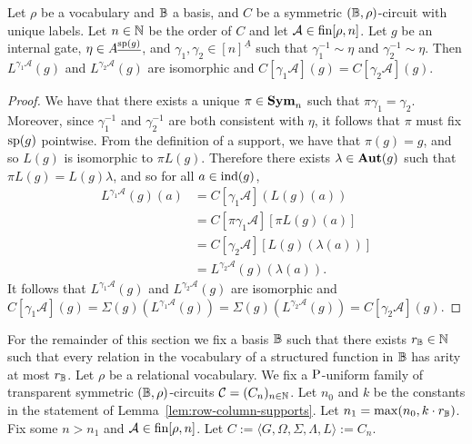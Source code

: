 \documentclass[../main/thesis.tex]{subfiles}
\begin{document}
\begin{lem}
  Let $\rho$ be a vocabulary and $\mathbb{B}$ a basis, and $C$ be a symmetric $(\mathbb{B},
  \rho)$-circuit with unique labels. Let $n \in \mathbb{N}$ be the order of $C$ and
  let $\mathcal{A} \in \text{\upshape fin}{[\rho, n]}$. Let $g$ be an internal gate, $\eta \in
  A^{\underline{\text{sp}(g)}}$, and $\gamma_1, \gamma_2 \in [n]^{\underline{A}}$
  such that $\gamma^{-1}_1 \sim \eta$ and $\gamma^{-1}_2 \sim \eta$. Then
  $L^{\gamma_1 \mathcal{A}}(g)$ and $L^{\gamma_2 \mathcal{A}}(g)$ are isomorphic
  and $C[\gamma_1 \mathcal{A}](g) = C[\gamma_2 \mathcal{A}](g)$.
	\label{lem:support-determines-evaluation}
\end{lem}
\begin{proof}
	We have that there exists a unique $\pi \in \text{\textbf{Sym}}_n$ such that $\pi \gamma_1 =
  \gamma_2$. Moreover, since $\gamma^{-1}_1$ and $\gamma^{-1}_2$ are both
  consistent with $\eta$, it follows that $\pi$ must fix $\text{sp}(g)$ pointwise.
  From the definition of a support, we have that $\pi (g) = g$, and so $L(g)$ is
  isomorphic to $\pi L(g)$. Therefore there exists $\lambda \in \text{\textbf{Aut}}(g)$ such
  that $\pi L(g) = L(g) \lambda$, and so for all $a \in \text{\upshape ind}(g)$,
	\begin{align*}
		L^{\gamma_1 \mathcal{A}}(g) (a) & = C [\gamma_1 \mathcal{A}](L(g)(a))                    \\
                                    & = C[\pi \gamma_1 \mathcal{A}][\pi L(g)(a)]            \\
                                    & = C[\gamma_2 \mathcal{A}][L(g)(\lambda(a))] \\
                                    & = L^{\gamma_2 \mathcal{A}}(g) (\lambda (a)).                 
	\end{align*}
	It follows that $L^{\gamma_1 \mathcal{A}}(g)$ and $L^{\gamma_2
    \mathcal{A}}(g)$ are isomorphic and $C[\gamma_1 \mathcal{A}](g) = \Sigma(g)
  (L^{\gamma_1 \mathcal{A}}(g)) = \Sigma(g) (L^{\gamma_2 \mathcal{A}}(g)) =
  C[\gamma_2 \mathcal{A}](g)$.
\end{proof}

For the remainder of this section we fix a basis $\mathbb{B}$ such that there exists
$r_{\mathbb{B}} \in \mathbb{N}$ such that every relation in the vocabulary of a structured
function in $\mathbb{B}$ has arity at most $r_{\mathbb{B}}$. Let $\rho$ be a relational
vocabulary. We fix a $\mathrm{P}$-uniform family of transparent symmetric $(\mathbb{B},
\rho)$-circuits $\mathcal{C} = (C_n)_{n \in \mathbb{N}}$. Let $n_0$ and $k$ be the
constants in the statement of Lemma~\ref{lem:row-column-supports}. Let $n_1 =
\max (n_0, k \cdot r_{\mathbb{B}})$. Fix some $n > n_1$ and $\mathcal{A} \in \text{\upshape fin}{[\rho,
  n]}$. Let $C := \langle G, \Omega, \Sigma, \Lambda, L \rangle := C_n$.
\end{document}
